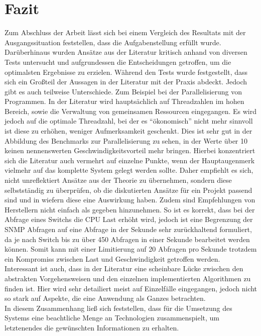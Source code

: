 \chapter{Fazit}
\label{cha:Fazit}

Zum Abschluss der Arbeit lässt sich bei einem Vergleich des Resultats mit der Ausgangssituation feststellen, dass die Aufgabenstellung erfüllt wurde.
Darüberhinaus wurden Ansätze aus der Literatur kritisch anhand von diversen Tests untersucht und aufgrundessen die Entscheidungen getroffen, um die optimalsten Ergebnisse zu erzielen.
Während den Tests wurde festgestellt, dass sich ein Großteil der Aussagen in der Literatur mit der Praxis abdeckt. Jedoch gibt es auch teilweise Unterschiede.
Zum Beispiel bei der Parallelisierung von Programmen. In der Literatur wird hauptsächlich auf Threadzahlen im hohen Bereich, sowie die Verwaltung von gemeinsamen Ressourcen eingegangen.
Es wird jedoch auf die optimale Threadzahl, bei der es “ökonomisch” nicht mehr sinnvoll ist diese zu erhöhen, weniger Aufmerksamkeit geschenkt.
Dies ist sehr gut in der Abbildung des Benchmarks zur Parallelisierung zu sehen, in der Werte über 10 keinen nennenswerten Geschwindigkeitsvorteil mehr bringen.
Hierbei konzentriert sich die Literatur auch vermehrt auf einzelne Punkte, wenn der Hauptaugenmerk vielmehr auf das komplette System gelegt werden sollte.
Daher empfiehlt es sich, nicht unreflektiert Ansätze aus der Theorie zu übernehmen, sondern diese selbstständig zu überprüfen, ob die diskutierten Ansätze für ein Projekt passend sind und in wiefern diese eine Auswirkung haben.
Zudem sind Empfehlungen von Herstellern nicht einfach als gegeben hinzunehmen.
So ist es korrekt, dass bei der Abfrage eines Switchs die CPU Last erhöht wird, jedoch ist eine Begrenzung der SNMP Abfragen auf eine Abfrage in der Sekunde sehr zurückhaltend formuliert, da je nach Switch bis zu über 450 Abfragen in einer Sekunde bearbeitet werden können. Somit kann mit einer Limitierung auf 20 Abfragen pro Sekunde trotzdem ein Kompromiss zwischen Last und Geschwindigkeit getroffen werden.\\
Interessant ist auch, dass in der Literatur eine scheinbare Lücke zwischen den abstrakten Vorgehensweisen und den einzelnen implementierten Algorithmen zu finden ist.
Hier wird sehr detailiert meist auf Einzelfälle eingegangen, jedoch nicht so stark auf Aspekte, die eine Anwendung als Ganzes betrachten.\\
In diesem Zusammenhang ließ sich feststellen, dass für die Umsetzung des Systems eine beachtliche Menge an Technologien zusammenspielt, um letztenendes die gewünschten Informationen zu erhalten.
